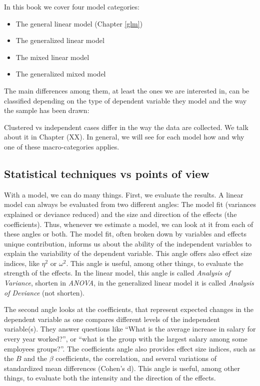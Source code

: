 \documentclass[
]{book}
\providecommand{\tightlist}{%
  \setlength{\itemsep}{0pt}\setlength{\parskip}{0pt}}
\begin{document}
In this book we cover four model categories:

\begin{itemize}
\tightlist
\item
  The general linear model (Chapter \ref{glm})
\item
  The generalized linear model
\item
  The mixed linear model
\item
  The generalized mixed model
\end{itemize}

The main differences among them, at least the ones we are interested in, can be classified depending on the type of dependent variable they model and the way the sample has been drawn:

Clustered vs independent cases differ in the way the data are collected. We talk about it in Chapter (XX). In general, we will see for each model how and why one of these macro-categories applies.

\hypertarget{angles}{%
\subsection{Statistical techniques vs points of view}\label{angles}}

With a model, we can do many things. First, we evaluate the results. A linear model can always be evaluated from two different angles: The model fit (variances explained or deviance reduced) and the size and direction of the effects (the coefficients). Thus, whenever we estimate a model, we can look at it from each of these angles or both. The model fit, often broken down by variables and effects unique contribution, informs us about the ability of the independent variables to explain the variability of the dependent variable. This angle offers also effect size indices, like \(\eta^2\) or \(\omega^2\). This angle is useful, among other things, to evaluate the strength of the effects. In the linear model, this angle is called \emph{Analysis of Variance}, shorten in \emph{ANOVA}, in the generalized linear model it is called \emph{Analysis of Deviance} (not shorten).

The second angle looks at the coefficients, that represent expected changes in the dependent variable as one compares different levels of the independent variable(s). They answer questions like ``What is the average increase in salary for every year worked?'', or ``what is the group with the largest salary among some employees groups?''. The coefficients angle also provides effect size indices, such as the \(B\) and the \(\beta\) coefficients, the correlation, and several variations of standardized mean differences (Cohen's d). This angle is useful, among other things, to evaluate both the intensity and the direction of the effects.
\end{document}
